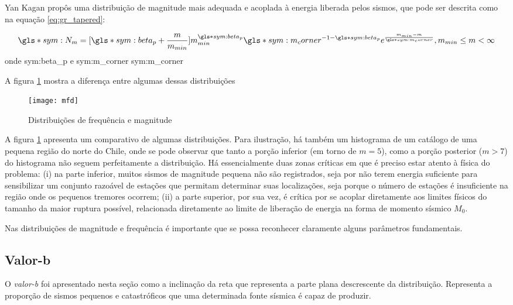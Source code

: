 Yan Kagan \citep{kagan_2002} propôs uma distribuição de magnitude mais adequada e acoplada à energia liberada pelos sismos, que
pode ser descrita como na equação \ref{eq:gr_tapered}:

\begin{equation}\ensuremath{
		\gls*{sym:N_m} = [\gls*{sym:beta_p} + \frac{m}{m_{min}}]
				m_{min}^{\gls*{sym:beta_p}}
				\gls*{sym:m_corner}^{-1 -\gls*{sym:beta_p}}
				e^{\frac{m_{min} - m}{\gls*{sym:m_corner}}}, 
				m_{min} \leq m < \infty
		}
	\label{eq:gr_tapered}
\end{equation}
onde \glsdesc*{sym:beta_p} e \gls*{sym:m_corner} \glsdesc*{sym:m_corner}

A figura \ref{f:mfd} mostra a diferença entre algumas dessas distribuições

\begin{figure}[H]
   \centering
   \texttt{[image: mfd]}
   \caption[Distribuições de frequência e magnitude]
   		   {Distribuições de frequência e magnitude} 
   \label{f:mfd}
\end{figure} 

A figura \ref{f:mfd} apresenta um comparativo de algumas distribuições. Para ilustração, há também um histograma de um catálogo de
uma pequena região do norte do Chile, onde se pode observar que tanto a porção inferior (em torno de $m=5$), como a porção
posterior ($m > 7$) do histograma não seguem perfeitamente a distribuição. Há essencialmente duas zonas críticas em que é preciso
estar atento à física do problema:
(i) na parte inferior, muitos sismos de magnitude pequena não são registrados, seja por não terem energia suficiente
para sensibilizar um conjunto razoável de estações que permitam determinar suas localizações, seja porque o número de
estações é insuficiente na região onde os pequenos tremores ocorrem; (ii) a parte superior, por sua vez, é crítica
por se acoplar diretamente aos limites físicos do tamanho da maior ruptura possível, relacionada diretamente ao limite de liberação de energia na forma de momento sísmico $M_0$.

Nas distribuições de magnitude e frequência é importante que se possa reconhecer claramente alguns parâmetros
fundamentais.

\subsection{Valor-b}
\label{sec:b_value}

O \emph{valor-b} foi apresentado nesta seção como a inclinação da reta que representa a parte plana descrescente da
distribuição. Representa a proporção de sismos pequenos e catastróficos que uma determinada fonte sísmica é capaz de
produzir.


